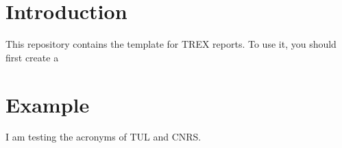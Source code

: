 \section{Introduction}

This repository contains the \Latex template for TREX reports.
To use it, you should first create a 

\section{Example}


I am testing the acronyms of \ac{TUL} and \ac{CNRS}.
